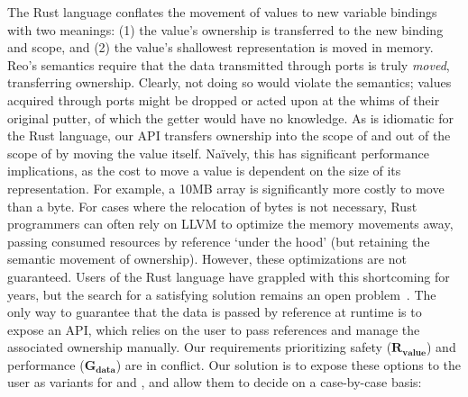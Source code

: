The Rust language conflates the movement of values to new variable bindings with two meanings: (1) the value's ownership is transferred to the new binding and scope, and (2) the value's shallowest representation is moved in memory. Reo's semantics require that the data transmitted through ports is truly \textit{moved}, transferring ownership. Clearly, not doing so would violate the semantics; values acquired through ports might be dropped or acted upon at the whims of their original putter, of which the getter would have no knowledge. As is idiomatic for the Rust language, our API transfers ownership into the scope of  and out of the scope of  by moving the value itself. Na\"ively, this has significant performance implications, as the cost to move a value is dependent on the size of its representation. For example, a 10MB array is significantly more costly to move than a byte. For cases where the relocation of bytes is not necessary, Rust programmers can often rely on LLVM to optimize the memory movements away, passing consumed resources by reference `under the hood' (but retaining the semantic movement of ownership). However, these optimizations are not guaranteed. Users of the Rust language have grappled with this shortcoming for years, but the search for a satisfying solution remains an open problem~\cite{matsakis_2015}. The only way to guarantee that the data is passed by reference at runtime is to expose an  API, which relies on the user to pass references and manage the associated ownership manually. Our requirements prioritizing safety ($\boldsymbol{R_{value}}$) and performance ($\boldsymbol{G_{data}}$) are in conflict. Our solution is to expose these options to the user as variants for  and , and allow them to decide on a case-by-case basis: 

